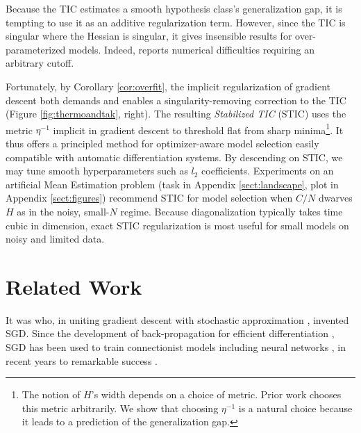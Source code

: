 \documentclass{article}
\theoremstyle{plain}
\theoremstyle{definition}
\begin{document}
        Because the TIC estimates a smooth hypothesis class's generalization
        gap, it is tempting to use it as an additive regularization term.
        However, since the TIC is singular where the Hessian is singular, it
        gives insensible results for over-parameterized models.  Indeed,
        \citet{di18} reports numerical difficulties requiring an arbitrary
        cutoff. 

        Fortunately, by Corollary \ref{cor:overfit}, the implicit
        regularization of gradient descent both demands and enables a
        singularity-removing correction to the TIC (Figure
        \ref{fig:thermoandtak}, right).  
        The resulting \emph{Stabilized TIC} (STIC) uses the metric $\eta^{-1}$
        implicit in gradient descent to threshold flat from sharp
        minima\footnote{
            The notion of $H$'s width depends on a choice of
            metric.  Prior work chooses this metric arbitrarily.  We show that
            choosing $\eta^{-1}$ is a natural choice because it leads to a
            prediction of the generalization gap.
        }.
        It thus offers a principled method for
        optimizer-aware model selection easily compatible with automatic
        differentiation systems.  By descending on STIC, we may tune smooth
        hyperparameters such as $l_2$ coefficients.  Experiments on an
        artificial Mean Estimation problem (task in Appendix
        \ref{sect:landscape}, plot in Appendix \ref{sect:figures}) recommend
        STIC for model selection when $C/N$ dwarves $H$ as in the
        noisy, small-$N$ regime.  Because diagonalization typically takes time
        cubic in dimension, exact STIC regularization is most useful for small
        models on noisy and limited data.


\section{Related Work} \label{sect:related}


    It was \citet{ki52} who, in uniting gradient descent \citep{ca47} with
    stochastic approximation \citep{ro51}, invented SGD.  Since the development
    of back-propagation for efficient differentiation \citep{we74}, SGD has
    been used to train connectionist models including neural networks
    \citep{bo91}, in recent years to remarkable success \citep{le15}.
\end{document}
